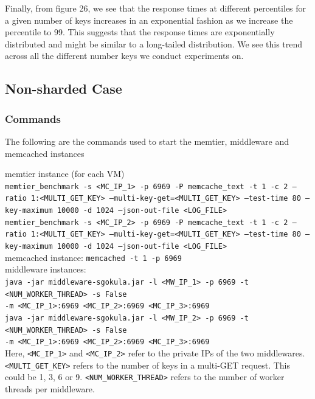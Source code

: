 \documentclass[11pt,a4paper]{article}
\newcommand\instructions[1]{\textcolor{blue}{Instructions: #1}}
\begin{document}
Finally, from figure 26, we see that the response times at different percentiles for a given number of keys increases in an exponential fashion as we increase the percentile to 99. This suggests that the response times are exponentially distributed and might be similar to a long-tailed distribution. We see this trend across all the  different number keys we conduct experiments on.
\subsection{Non-sharded Case}



\subsubsection{Commands}
The following are the commands used to start the memtier, middleware and memcached instances

{\scriptsize
	memtier instance (for each VM) \\ 
	\texttt{memtier\_benchmark -s <MC\_IP\_1> -p 6969 -P memcache\_text -t 1 -c 2 --ratio 1:<MULTI\_GET\_KEY> --multi-key-get=<MULTI\_GET\_KEY> --test-time 80 --key-maximum 10000 -d 1024 --json-out-file <LOG\_FILE>} \\
	\texttt{memtier\_benchmark -s <MC\_IP\_2> -p 6969 -P memcache\_text -t 1 -c 2 --ratio 1:<MULTI\_GET\_KEY> --multi-key-get=<MULTI\_GET\_KEY> --test-time 80 --key-maximum 10000 -d 1024 --json-out-file <LOG\_FILE>} \\
	memcached instance: \texttt{memcached -t 1 -p 6969} \\
	middleware instances: \\
	\texttt{java -jar middleware-sgokula.jar -l <MW\_IP\_1> -p 6969 -t <NUM\_WORKER\_THREAD> -s False \\ -m <MC\_IP\_1>:6969 <MC\_IP\_2>:6969 <MC\_IP\_3>:6969} \\
	\texttt{java -jar middleware-sgokula.jar -l <MW\_IP\_2> -p 6969 -t <NUM\_WORKER\_THREAD> -s False \\ -m <MC\_IP\_1>:6969 <MC\_IP\_2>:6969 <MC\_IP\_3>:6969} \\ 
}
Here, \texttt{<MC\_IP\_1>} and \texttt{<MC\_IP\_2>} refer to the private IPs of the two middlewares. \texttt{<MULTI\_GET\_KEY>} refers to the number of keys in a multi-GET request. This could be 1, 3, 6 or 9. \texttt{<NUM\_WORKER\_THREAD>} refers to the number of worker threads per middleware.
\end{document}
